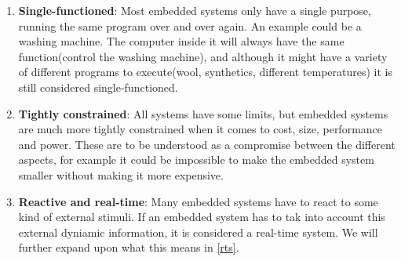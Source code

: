 \begin{enumerate}
  \item \textbf{Single-functioned}: Most embedded systems only have a single
  purpose, running the same program over and over again. An example could be a
  washing machine. The computer inside it will always have the same
  function(control the washing machine), and although it might have a variety of
  different programs to execute(wool, synthetics, different temperatures) it is
  still considered single-functioned.
  \item \textbf{Tightly constrained}: All systems have some limits, but embedded
  systems are much more tightly constrained when it comes to cost, size,
  performance and power. These are to be understood as a compromise between the
  different aspects, for example it could be impossible to make the embedded
  system smaller without making it more expensive.
  \item \textbf{Reactive and real-time}: Many embedded systems have to react to
  some kind of external stimuli. If an embedded system has to tak into account
  this external dyniamic information, it is considered a real-time system. We
  will further expand upon what this means in \autoref{rts}.
\end{enumerate}
